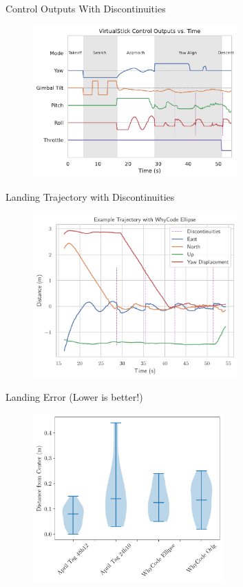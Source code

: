 \documentclass[aspectratio=169]{beamer}
\begin{document}
\begin{frame}{Control Outputs With Discontinuities}
	\begin{figure}
		\centering
		\includegraphics[width=0.7\textwidth]{./images/control_example_with_discontinuities}
	\end{figure}
\end{frame}

\begin{frame}{Landing Trajectory with Discontinuities}
	\begin{figure}
		\centering
		\includegraphics[width=0.7\textwidth]{./images/landing_trajectory_with_discontinuities}
	\end{figure}
\end{frame}

\begin{frame}{Landing Error (Lower is better!)}
	\begin{figure}
		\centering
		\includegraphics[width=0.65\textwidth]{./images/violin_plot_landing_radii}
	\end{figure}
\end{frame}
\end{document}
